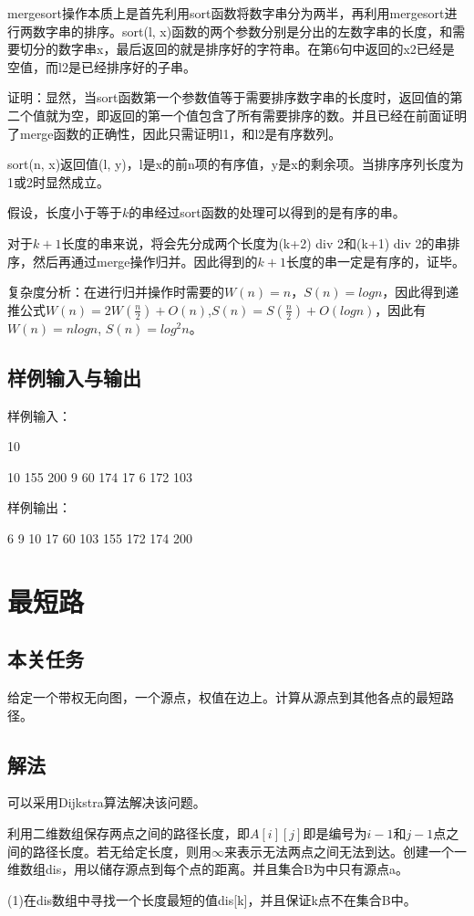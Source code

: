 \documentclass[UTF8,a4paperdui, %
]{ctexart}
\begin{document}
mergesort操作本质上是首先利用sort函数将数字串分为两半，再利用mergesort进行两数字串的排序。sort(l, x)函数的两个参数分别是分出的左数字串的长度，和需要切分的数字串x，最后返回的就是排序好的字符串。在第6句中返回的x2已经是空值，而l2是已经排序好的子串。

证明：显然，当sort函数第一个参数值等于需要排序数字串的长度时，返回值的第二个值就为空，即返回的第一个值包含了所有需要排序的数。并且已经在前面证明了merge函数的正确性，因此只需证明l1，和l2是有序数列。

sort(n, x)返回值(l, y)，l是x的前n项的有序值，y是x的剩余项。当排序序列长度为1或2时显然成立。

假设，长度小于等于$k$的串经过sort函数的处理可以得到的是有序的串。

对于$k+1$长度的串来说，将会先分成两个长度为(k+2) div 2和(k+1) div 2的串排序，然后再通过merge操作归并。因此得到的$k+1$长度的串一定是有序的，证毕。

复杂度分析：在进行归并操作时需要的$W(n)=n$，$S(n)=logn$，因此得到递推公式$W(n)=2W(\frac{n}{2})+O(n)$,$S(n)=S(\frac{n}{2})+O(logn)$，因此有$W(n)=nlogn$, $S(n)=log^2n$。


\subsection{样例输入与输出}
样例输入：

10

10 155 200 9 60 174 17 6 172 103

样例输出：

6 9 10 17 60 103 155 172 174 200 
\section{最短路}
\subsection{本关任务}
给定一个带权无向图，一个源点，权值在边上。计算从源点到其他各点的最短路径。
\subsection{解法}
可以采用Dijkstra算法解决该问题。

利用二维数组保存两点之间的路径长度，即$A[i][j]$即是编号为$i-1$和$j-1$点之间的路径长度。若无给定长度，则用$\infty$来表示无法两点之间无法到达。创建一个一维数组dis，用以储存源点到每个点的距离。并且集合B为中只有源点a。

(1)在dis数组中寻找一个长度最短的值dis[k]，并且保证k点不在集合B中。
\end{document}
